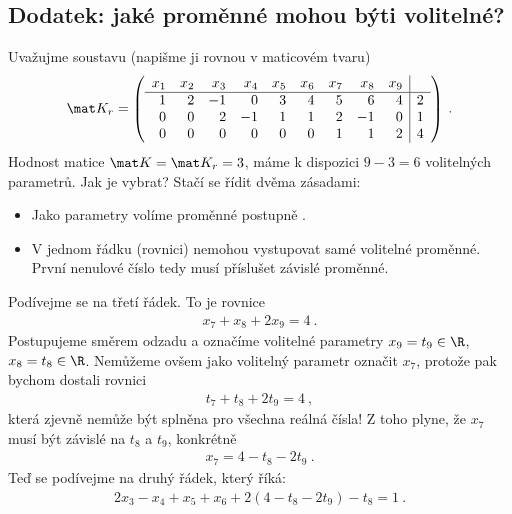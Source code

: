 \subsection*{Dodatek: jaké proměnné mohou býti volitelné?}

\begin{example}
    Uvažujme soustavu (napišme ji rovnou v maticovém tvaru)
    \begin{align}
        \mat K_r = \left(\begin{array}{rrrrrrrrr|r}
            x_1 & x_2 & x_3 & x_4 & x_5 & x_6 & x_7 & x_8 & x_9 \\ \hline
            1 & 2 & -1 & 0 & 3 & 4 & 5 & 6 & 4 & 2 \\
            0 & 0 & 2  & -1 & 1 & 1 & 2 & -1 & 0 & 1 \\
            0 & 0 & 0  & 0 & 0 & 0 & 1 & 1 & 2 & 4 \\
        \end{array}\right) \:.
    \end{align}
    Hodnost matice $\mat K = \mat K_r = 3$, máme k dispozici $9-3=6$ volitelných parametrů. Jak je vybrat? Stačí se řídit dvěma zásadami:
    \begin{itemize}
        \item Jako parametry volíme proměnné postupně . 
        \item V jednom řádku (rovnici) nemohou vystupovat samé volitelné proměnné. První nenulové číslo tedy musí příslušet závislé proměnné.
    \end{itemize}
    Podívejme se na třetí řádek. To je rovnice \begin{align}
        x_7 + x_8 + 2x_9 = 4 \:.
    \end{align}
    Postupujeme směrem odzadu a označíme volitelné parametry $x_9 = t_9 \in \R$, $x_8 = t_8 \in \R$. Nemůžeme ovšem jako volitelný parametr označit $x_7$, protože pak bychom dostali rovnici
    \begin{align}
        t_7 + t_8 + 2t_9 = 4 \:,
    \end{align}
    která zjevně nemůže být splněna pro všechna reálná čísla! Z toho plyne, že $x_7$ musí být závislé na $t_8$ a $t_9$, konkrétně
    \begin{align}
        x_7 = 4 - t_8 - 2 t_9 \:.
    \end{align}
    Teď se podívejme na druhý řádek, který říká:
    \begin{align}
        2 x_3 - x_4 + x_5 + x_6 + 2 (4 - t_8 - 2 t_9) -t_8  = 1 \:.
    \end{align}

\end{example}
